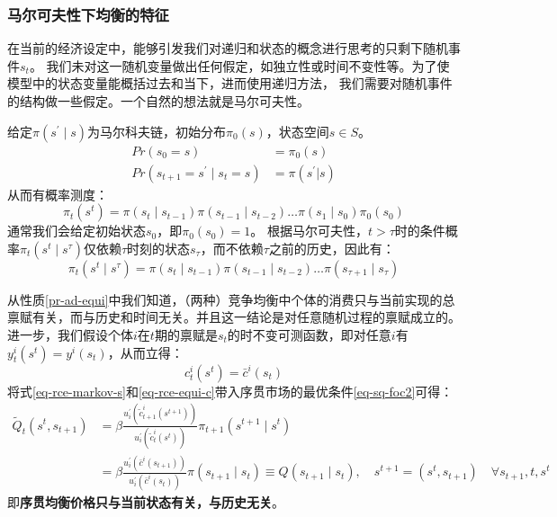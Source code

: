 \subsubsection{马尔可夫性下均衡的特征}

在当前的经济设定中，能够引发我们对递归和状态的概念进行思考的只剩下随机事件$s_t$。
我们未对这一随机变量做出任何假定，如独立性或时间不变性等。为了使模型中的状态变量能概括过去和当下，进而使用递归方法，
我们需要对随机事件的结构做一些假定。一个自然的想法就是马尔可夫性。

给定$\pi\left(s^{\prime}\mid s\right)$为马尔科夫链，初始分布$\pi_0(s)$，状态空间$s\in S$。
\begin{equation*}
    \begin{aligned}
        Pr\left(s_0=s\right) &= \pi_0(s) \\
        Pr\left(s_{t+1}=s^{\prime}\mid s_t=s\right) &= \pi\left(s^{\prime}|s\right)
    \end{aligned}
\end{equation*}
从而有概率测度：
\begin{equation*}
    \pi_t\left(s^t\right)=
        \pi\left(s_t\mid s_{t-1}\right)\pi\left(s_{t-1}\mid s_{t-2}\right)\ldots\pi\left(s_1 \mid s_0\right)\pi_0\left(s_0\right)
\end{equation*}
通常我们会给定初始状态$s_0$，即$\pi_0\left(s_0\right)=1$。
根据马尔可夫性，$t>\tau$时的条件概率$\pi_t\left(s^t\mid s^{\tau}\right)$仅依赖$\tau$时刻的状态$s_{\tau}$，而不依赖$\tau$之前的历史，因此有：
\begin{equation}   \label{eq-rce-markov-s}
    \pi_t\left(s^t \mid s^\tau\right)=
        \pi\left(s_t \mid s_{t-1}\right) \pi\left(s_{t-1} \mid s_{t-2}\right) \ldots \pi\left(s_{\tau+1} \mid s_\tau\right)
\end{equation}

从性质\ref{pr-ad-equi}中我们知道，（两种）竞争均衡中个体的消费只与当前实现的总禀赋有关，而与历史和时间无关。并且这一结论是对任意随机过程的禀赋成立的。
进一步，我们假设个体$i$在$t$期的禀赋是$s_t$的时不变可测函数，即对任意$i$有$y_t^i\left(s^t\right)=y^i\left(s_t\right)$，从而立得：
\begin{equation}    \label{eq-rce-equi-c}
    c_t^i\left(s^t\right) = \bar{c}^i\left(s_t\right)
\end{equation}
将式\ref{eq-rce-markov-s}和\ref{eq-rce-equi-c}带入序贯市场的最优条件\ref{eq-sq-foc2}可得：
\begin{equation}    \label{eq-rce-foc}
    \begin{aligned}
        \tilde{Q}_t\left(s^t, s_{t+1}\right) 
        &= \beta \frac{u_i^{\prime}\left(\tilde{c}_{t+1}^i\left(s^{t+1}\right)\right)}
                    {u_i^{\prime}\left(\tilde{c}_t^i\left(s^t\right)\right)} \pi_{t+1}\left(s^{t+1} \mid s^t\right) \\
        &= \beta \frac{u_i^{\prime}\left(\bar{c}^i\left(s_{t+1}\right)\right)}{u_i^{\prime}\left(\bar{c}^i\left(s_t\right)\right)} 
            \pi\left(s_{t+1} \mid s_t\right) \equiv Q\left(s_{t+1} \mid s_t\right), 
                \quad s^{t+1}=(s^t,s_{t+1}) \quad \forall s_{t+1}, t, s^t        
    \end{aligned}
\end{equation}
即\textbf{序贯均衡价格只与当前状态有关，与历史无关}。

